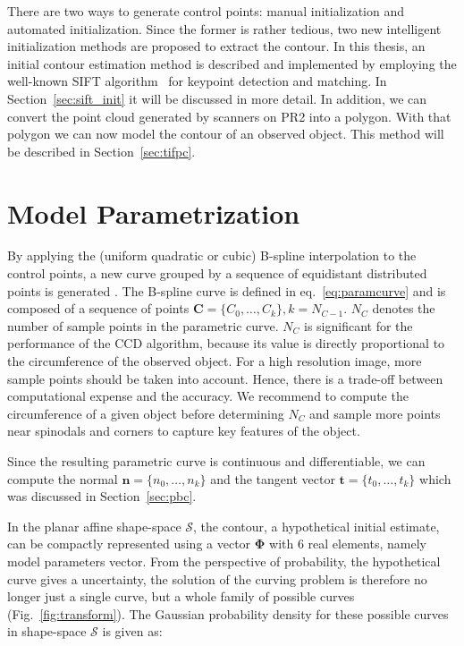 There are two ways to generate control points:
manual initialization and automated initialization. 
Since the former is rather tedious, two new
intelligent initialization methods are proposed to extract the
contour.
In this thesis, an initial contour estimation method is described and
implemented by employing the well-known SIFT algorithm~\cite{lowe2004distinctive} for
keypoint detection and matching. In Section~\ref{sec:sift_init} it will be discussed in
more detail. In addition, we can convert the point cloud generated
by scanners on PR2 into a polygon. With that polygon we can now model the contour
of an observed object. This method will be described in Section~\ref{sec:tifpc}.

\section{Model Parametrization}
\label{sec:mp}

By applying the (uniform quadratic or cubic) B-spline interpolation to the control points, a new curve
grouped by a sequence of equidistant distributed points is generated
. The B-spline curve is defined in eq.~\ref{eq:paramcurve} and is
composed of a sequence of points $\mathbf{C} = \{C_0, \ldots,
C_{k}\}, k = N_{C-1}$. $N_C$ denotes the number of sample points in the
parametric curve. $N_C$ is significant for the
performance of the CCD algorithm, because its value is directly
proportional to the circumference of the observed object. For a high
resolution image, more sample points should be taken into account.
Hence, there is a trade-off between computational expense and the
accuracy. We recommend to compute the circumference of a given object before
determining $N_C$ and sample more points near spinodals and corners to
capture key features of the object.

Since the resulting parametric curve is continuous and
differentiable, we can compute the normal $\mathbf{n} = \{n_0, \ldots,
n_{k}\}$ and the tangent vector $\mathbf{t} = \{t_0, \ldots, t_{k}\}$
which was discussed in Section~\ref{sec:pbc}. 

In the planar affine shape-space $\mathcal{S}$, the contour, a
hypothetical initial estimate, can be compactly represented using a
vector $\mathbf{\Phi}$ with 6 real elements, namely model
parameters vector. From the perspective of probability, the hypothetical
curve gives a uncertainty, the solution of the curving problem is
therefore no longer just a single curve, but a whole family of
possible curves (Fig.~\ref{fig:transform}). The Gaussian probability density for these possible
curves in shape-space $\mathcal{S}$ is given as:

